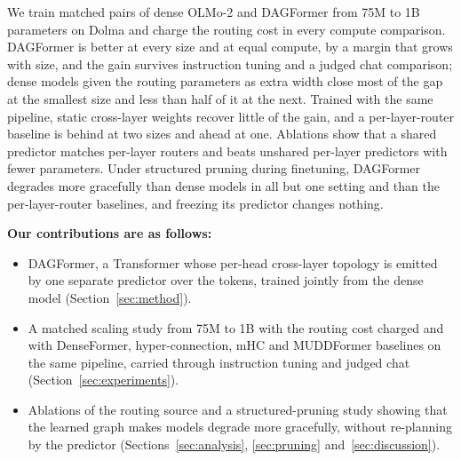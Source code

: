 \documentclass[11pt]{article}
\newcommand{\dagf}{DAGFormer}
\begin{document}
We train matched pairs of dense OLMo-2 and \dagf{} from 75M to 1B parameters on Dolma \citep{soldaini2024dolma} and charge the routing cost in every compute comparison. \dagf{} is better at every size and at equal compute, by a margin that grows with size, and the gain survives instruction tuning and a judged chat comparison; dense models given the routing parameters as extra width close most of the gap at the smallest size and less than half of it at the next. Trained with the same pipeline, static cross-layer weights recover little of the gain, and a per-layer-router baseline is behind at two sizes and ahead at one. Ablations show that a shared predictor matches per-layer routers and beats unshared per-layer predictors with fewer parameters. Under structured pruning during finetuning, \dagf{} degrades more gracefully than dense models in all but one setting and than the per-layer-router baselines, and freezing its predictor changes nothing. 

\textbf{Our contributions are as follows:}
\begin{itemize}\setlength\itemsep{0pt}
\item \dagf{}, a Transformer whose per-head cross-layer topology is emitted by one separate predictor over the tokens, trained jointly from the dense model (Section~\ref{sec:method}).
\item A matched scaling study from 75M to 1B with the routing cost charged and with DenseFormer, hyper-connection, mHC and MUDDFormer baselines on the same pipeline, carried through instruction tuning and judged chat (Section~\ref{sec:experiments}).
\item Ablations of the routing source and a structured-pruning study showing that the learned graph makes models degrade more gracefully, without re-planning by the predictor (Sections~\ref{sec:analysis}, \ref{sec:pruning} and~\ref{sec:discussion}).
\end{itemize}
\end{document}
